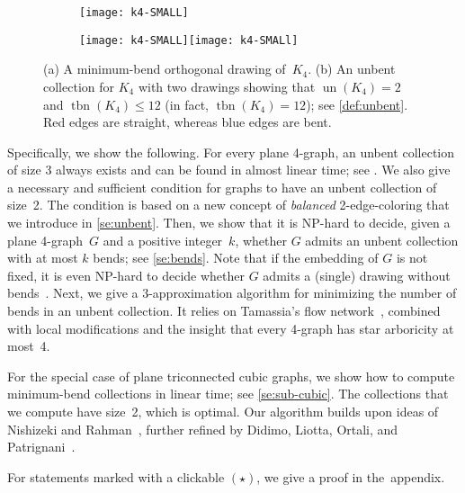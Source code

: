 \documentclass[runningheads]{llncs}
\newcommand\lip[1]{}
\newcommand{\un}{\operatorname{un}}
\newcommand{\tbn}{\operatorname{tbn}}
\begin{document}
\begin{figure}[t]
  \begin{subfigure}{0.28\textwidth}
    \centering
    \texttt{[image: k4-SMALL]}
    \subcaption{} %
    \label{fig:k4-3}
  \end{subfigure}
  \hfill
  \begin{subfigure}{.68\textwidth}
    \centering
    \texttt{[image: k4-SMALL]}\quad\quad\texttt{[image: k4-SMALl]}
    \subcaption{\lip{\nolinenumbers{}}}
  \end{subfigure}
  \caption{(a) A minimum-bend orthogonal drawing of~$K_4$.
    (b) An unbent collection
    for $K_4$ with two drawings %
    showing that $\un(K_4)=2$
    and $\tbn(K_4) \le 12$ (in fact, $\tbn(K_4) = 12$); see \cref{def:unbent}.
    Red edges are straight, whereas blue edges are bent.
    }
\label{fig:k4}
\end{figure}

Specifically, we show the following.
For every plane 4-graph, an unbent collection of size 3 %
always exists and %
can be found in almost linear time; see . 
We also give a necessary and sufficient condition for graphs to have an unbent collection of size~2.  The condition is based on a new concept of
{\em balanced} 2-edge-coloring that we introduce in \cref{se:unbent}.
Then, we show that it is NP-hard to decide, given a plane 4-graph~$G$
and a positive integer~$k$, whether $G$ admits an unbent collection
with at most $k$ bends; see \cref{se:bends}.
Note that if the embedding of $G$ is not fixed, it is even NP-hard to
decide whether $G$ admits a (single) drawing without
bends~\cite{DBLP:journals/siamcomp/GargT01}.
Next, we give a 3-approximation algorithm for minimizing the number of
bends in an unbent collection.
It relies on Tamassia's flow network~\cite{t-oeggwmnb-sjc}, combined with local
modifications and the insight that every 4-graph has star arboricity
at most~4.

For the special case of plane triconnected cubic graphs, we show how to compute minimum-bend collections in linear time; see \cref{se:sub-cubic}.
The collections that we compute have size~2, which is optimal.
Our algorithm builds upon ideas of Nishizeki and Rahman~\cite{DBLP:journals/jgaa/RahmanNN99,DBLP:journals/jgaa/RahmanNN03},
further refined by Didimo, Liotta, Ortali, and Patrignani~\cite{DBLP:conf/soda/DidimoLOP20}. %

For statements marked with a clickable $(\star)$, we give a proof in the~appendix.
\end{document}
